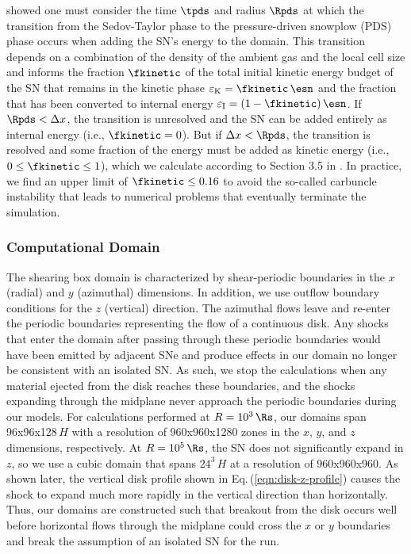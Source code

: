 \citet{Simpson+15} showed one must consider the time $\tpds$ and radius $\Rpds$ at which the transition from the Sedov-Taylor phase to the pressure-driven snowplow (PDS) phase occurs when adding the SN's energy to the domain. This transition depends on a combination of the density of the ambient gas and the local cell size and informs the fraction $\fkinetic$ of the total initial kinetic energy budget of the SN that remains in the kinetic phase $\varepsilon_{\rm K} = \fkinetic\,\esn$ and the fraction that has been converted to internal energy $\varepsilon_{\rm I} = (1-\fkinetic)\,\esn$. If $\Rpds < \Delta x$, the transition is unresolved and the SN can be added entirely as internal energy (i.e., $\fkinetic = 0$). But if $\Delta x < \Rpds$, the transition is resolved and some fraction of the energy must be added as kinetic energy (i.e., $0\leq\fkinetic\leq1$), which we calculate according to Section 3.5 in \citet{Simpson+15}. In practice, we find an upper limit of $\fkinetic \leq 0.16$ to avoid the so-called carbuncle instability \citep{PeeryImlay88, Robinet+00} that leads to numerical problems that eventually terminate the simulation.


\subsubsection{Computational Domain} \label{sec:HydroDomains}

The shearing box domain is characterized by shear-periodic boundaries in the $x$ (radial) and $y$ (azimuthal) dimensions.
In addition, we use outflow boundary conditions for the $z$ (vertical) direction.
The azimuthal flows leave and re-enter the periodic boundaries representing the flow of a continuous disk.
Any shocks that enter the domain after passing through these periodic boundaries would have been emitted by adjacent SNe and produce effects in our domain no longer be consistent with an isolated SN.
As such, we stop the calculations when any material ejected from the disk reaches these boundaries, and the shocks expanding through the midplane never approach the periodic boundaries during our models.
For calculations performed at $R=10^3\,\Rs$, our domains span 96x96x128$\,H$ with a resolution of 960x960x1280 zones in the $x$, $y$, and $z$ dimensions, respectively.
At $R=10^5\,\Rs$, the SN does not significantly expand in $z$, so we use a cubic domain that spans $24^3\,H$ at a resolution of 960x960x960.
As shown later, the vertical disk profile shown in Eq.\,(\ref{eqn:disk-z-profile}) causes the shock to expand much more rapidly in the vertical direction than horizontally.
Thus, our domains are constructed such that breakout from the disk occurs well before horizontal flows through the midplane could cross the $x$ or $y$ boundaries and break the assumption of an isolated SN for the run.


